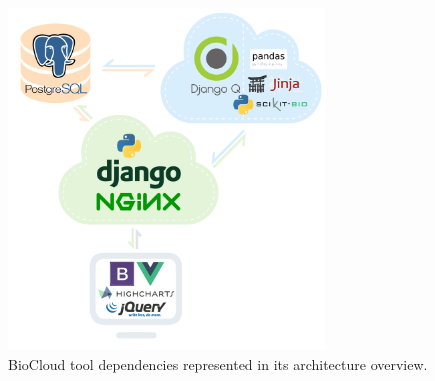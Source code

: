 \begin{figure}[!htb]
\centering
\includegraphics[width=0.75\textwidth]{images/overview_arch_tools}
\caption[BioCloud tool dependencies]{
    BioCloud tool dependencies represented in its architecture overview.
}
\label{fig:overview-arch-tool}
\end{figure}
